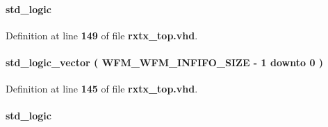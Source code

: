 \paragraph[{inst2\+\_\+phy\+\_\+clk}]{ {\bfseries \textcolor{comment}{std\+\_\+logic}\textcolor{vhdlchar}{ }} \hspace{0.3cm}{\ttfamily [Signal]}}\label{classrxtx__top_1_1arch_a32427930f689886148d6cff80f9ad7c9}


Definition at line {\bf 149} of file {\bf rxtx\+\_\+top.\+vhd}.

\paragraph[{inst2\+\_\+wfm\+\_\+infifo\+\_\+wrusedw}]{ {\bfseries \textcolor{comment}{std\+\_\+logic\+\_\+vector}\textcolor{vhdlchar}{ }\textcolor{vhdlchar}{(}\textcolor{vhdlchar}{ }\textcolor{vhdlchar}{ }\textcolor{vhdlchar}{ }\textcolor{vhdlchar}{ }{\bfseries {\bf W\+F\+M\+\_\+\+W\+F\+M\+\_\+\+I\+N\+F\+I\+F\+O\+\_\+\+S\+I\+ZE}} \textcolor{vhdlchar}{-\/}\textcolor{vhdlchar}{ } \textcolor{vhdldigit}{1} \textcolor{vhdlchar}{ }\textcolor{keywordflow}{downto}\textcolor{vhdlchar}{ }\textcolor{vhdlchar}{ } \textcolor{vhdldigit}{0} \textcolor{vhdlchar}{ }\textcolor{vhdlchar}{)}\textcolor{vhdlchar}{ }} \hspace{0.3cm}{\ttfamily [Signal]}}\label{classrxtx__top_1_1arch_a54e2231a7edd77d34718e98ca6830c94}


Definition at line {\bf 145} of file {\bf rxtx\+\_\+top.\+vhd}.

\paragraph[{inst2\+\_\+wfm\+\_\+rdy}]{ {\bfseries \textcolor{comment}{std\+\_\+logic}\textcolor{vhdlchar}{ }} \hspace{0.3cm}{\ttfamily [Signal]}}\label{classrxtx__top_1_1arch_a20183f61d2ee5cd872ae1091adc89a49}


